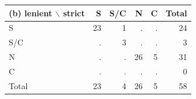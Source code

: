 \begin{center}\small
\begin{tabular}{@{}lrrrrr@{}}\toprule
(b) lenient $\backslash$ strict & S & S/C & N & C & Total \\ \midrule
S & 23 & 1 & . & . & 24 \\
S/C & . & 3 & . & . & 3 \\
N & . & . & 26 & 5 & 31 \\
C & . & . & . & . & 0 \\
\midrule Total & 23 & 4 & 26 & 5 & 58 \\
\bottomrule\end{tabular}\end{center}
